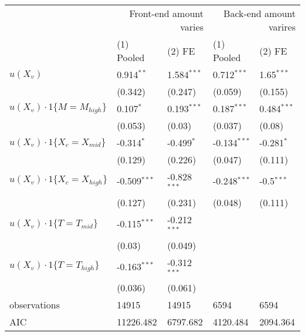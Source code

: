 \begin{tabular}{lllll}
\hline
 & \multicolumn{2}{r}{Front-end amount varies} & \multicolumn{2}{r}{Back-end amount varires} \\
 & (1) Pooled & (2) FE & (1) Pooled & (2) FE \\
\hline
$u(X_v)$ & 0.914$^{**}$ & 1.584$^{***}$ & 0.712$^{***}$ & 1.65$^{***}$ \\
 & (0.342) & (0.247) & (0.059) & (0.155) \\
$u(X_v)\cdot1\{M=M_{high}\}$ & 0.107$^{*}$ & 0.193$^{***}$ & 0.187$^{***}$ & 0.484$^{***}$ \\
 & (0.053) & (0.03) & (0.037) & (0.08) \\
$u(X_v)\cdot1\{X_c=X_{mid}\}$ & -0.314$^{*}$ & -0.499$^{*}$ & -0.134$^{***}$ & -0.281$^{*}$ \\
 & (0.129) & (0.226) & (0.047) & (0.111) \\
$u(X_v)\cdot1\{X_c=X_{high}\}$ & -0.509$^{***}$ & -0.828$^{***}$ & -0.248$^{***}$ & -0.5$^{***}$ \\
 & (0.127) & (0.231) & (0.048) & (0.111) \\
$u(X_v)\cdot1\{T=T_{mid}\}$ & -0.115$^{***}$ & -0.212$^{***}$ &  &  \\
 & (0.03) & (0.049) &  &  \\
$u(X_v)\cdot1\{T=T_{high}\}$ & -0.163$^{***}$ & -0.312$^{***}$ &  &  \\
 & (0.036) & (0.061) &  &  \\\hline

observations & 14915 & 14915 & 6594 & 6594 \\
AIC & 11226.482 & 6797.682 & 4120.484 & 2094.364 \\
\hline
\end{tabular}
